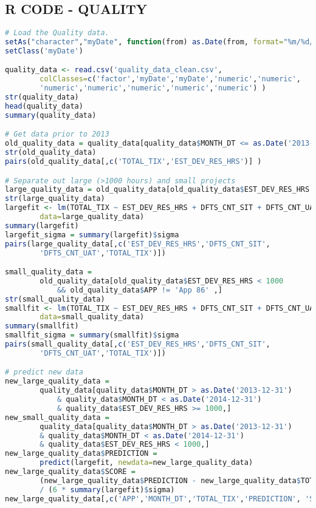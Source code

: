 \documentclass[SDSUThesis.tex]{subfiles}
\begin{document}
\subsection{R CODE - QUALITY} 
\scriptsize{
\begin{lstlisting}[language=R]
# Load the Quality data.
setAs("character","myDate", function(from) as.Date(from, format="%m/%d/%Y") )
setClass('myDate')

quality_data <- read.csv('quality_data_clean.csv', 
        colClasses=c('factor','myDate','myDate','numeric','numeric',
        'numeric','numeric','numeric','numeric','numeric') )
str(quality_data)
head(quality_data)
summary(quality_data)

# Get data prior to 2013
old_quality_data = quality_data[quality_data$MONTH_DT <= as.Date('2013-12-31') ,]
str(old_quality_data)
pairs(old_quality_data[,c('TOTAL_TIX','EST_DEV_RES_HRS')] )

# Separate out large (>1000 hours) and small projects
large_quality_data = old_quality_data[old_quality_data$EST_DEV_RES_HRS >= 1000,]
str(large_quality_data)
largefit <- lm(TOTAL_TIX ~ EST_DEV_RES_HRS + DFTS_CNT_SIT + DFTS_CNT_UAT , 
        data=large_quality_data)
summary(largefit)
largefit_sigma = summary(largefit)$sigma
pairs(large_quality_data[,c('EST_DEV_RES_HRS','DFTS_CNT_SIT',
        'DFTS_CNT_UAT','TOTAL_TIX')])

small_quality_data = 
        old_quality_data[old_quality_data$EST_DEV_RES_HRS < 1000 
            && old_quality_data$APP != 'App 86' ,]
str(small_quality_data)
smallfit <- lm(TOTAL_TIX ~ EST_DEV_RES_HRS + DFTS_CNT_SIT + DFTS_CNT_UAT , 
        data=small_quality_data)
summary(smallfit)
smallfit_sigma = summary(smallfit)$sigma
pairs(small_quality_data[,c('EST_DEV_RES_HRS','DFTS_CNT_SIT',
        'DFTS_CNT_UAT','TOTAL_TIX')])

# predict new data  
new_large_quality_data = 
        quality_data[quality_data$MONTH_DT > as.Date('2013-12-31') 
            & quality_data$MONTH_DT < as.Date('2014-12-31') 
            & quality_data$EST_DEV_RES_HRS >= 1000,]
new_small_quality_data = 
        quality_data[quality_data$MONTH_DT > as.Date('2013-12-31') 
        & quality_data$MONTH_DT < as.Date('2014-12-31') 
        & quality_data$EST_DEV_RES_HRS < 1000,]
new_large_quality_data$PREDICTION = 
        predict(largefit, newdata=new_large_quality_data)
new_large_quality_data$SCORE = 
        (new_large_quality_data$PREDICTION - new_large_quality_data$TOTAL_TIX)
        / (6 * summary(largefit)$sigma)
new_large_quality_data[,c('APP','MONTH_DT','TOTAL_TIX','PREDICTION', 'SCORE')]


\end{lstlisting}}
\end{document}

